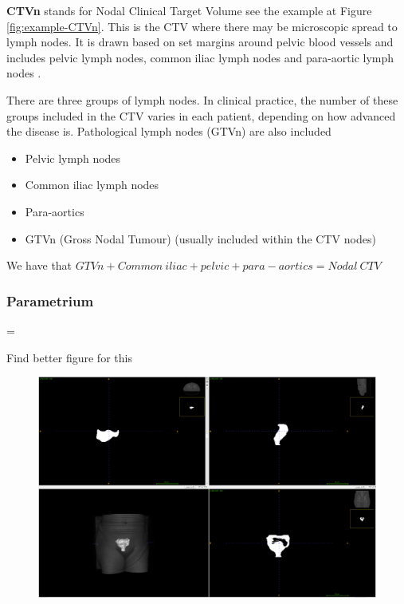 \documentclass[11pt,twoside]{report}
\newenvironment{warning}
  {\par\begin{mdframed}[linewidth=1pt,linecolor=black]%
    \begin{list}{}{\leftmargin=1cm
                   \labelwidth=\leftmargin}\item[\Large\ding{43}]}
  {\end{list}\end{mdframed}\par}
\begin{document}
\textbf{CTVn} stands for Nodal Clinical Target Volume see the example at Figure \ref{fig:example-CTVn}. This is the CTV where there may be microscopic spread to lymph nodes. It is drawn based on set margins around pelvic blood vessels and includes pelvic lymph nodes, common iliac lymph nodes and para-aortic lymph nodes \cite{AMLART-data}.

There are three groups of lymph nodes. In clinical practice, the number of these groups included in the CTV varies in each patient, depending on how advanced the disease is. Pathological lymph nodes (GTVn) are also included

\begin{itemize}
    \item Pelvic lymph nodes
    \item Common iliac lymph nodes
    \item Para-aortics
    \item GTVn (Gross Nodal Tumour) (usually included within the CTV nodes)
\end{itemize}

We have that $GTVn + Common\ iliac + pelvic + para-aortics = Nodal\ CTV$

\subsubsection{Parametrium}\label{sec:data-Parametrium}

\begin{warning}
  Find better figure for this
\end{warning}

\begin{figure}[H]
  \centering
  \includegraphics[width=0.7\linewidth]{../figures/Parametrium.png}
  \label{fig:example-parametrium}
\end{figure}
\end{document}
